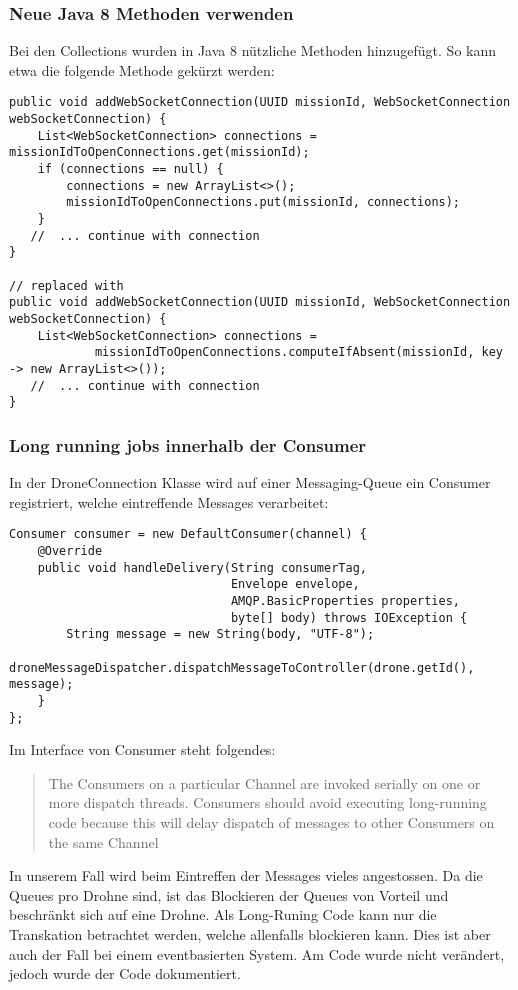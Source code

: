 \subsubsection{Neue Java 8 Methoden verwenden}
Bei den Collections wurden in Java 8 nützliche Methoden hinzugefügt. So kann etwa die folgende Methode gekürzt werden:

\begin{lstlisting}
public void addWebSocketConnection(UUID missionId, WebSocketConnection webSocketConnection) {
    List<WebSocketConnection> connections = missionIdToOpenConnections.get(missionId);
    if (connections == null) {
        connections = new ArrayList<>();
        missionIdToOpenConnections.put(missionId, connections);
    }
   //  ... continue with connection
}

// replaced with
public void addWebSocketConnection(UUID missionId, WebSocketConnection webSocketConnection) {
    List<WebSocketConnection> connections =
            missionIdToOpenConnections.computeIfAbsent(missionId, key -> new ArrayList<>());
   //  ... continue with connection
}
\end{lstlisting}


\subsubsection{Long running jobs innerhalb der Consumer}
In der DroneConnection Klasse wird auf einer Messaging-Queue ein Consumer registriert, welche eintreffende Messages verarbeitet:
\begin{lstlisting}
Consumer consumer = new DefaultConsumer(channel) {
    @Override
    public void handleDelivery(String consumerTag,
                               Envelope envelope,
                               AMQP.BasicProperties properties,
                               byte[] body) throws IOException {
        String message = new String(body, "UTF-8");
        droneMessageDispatcher.dispatchMessageToController(drone.getId(), message);
    }
};
\end{lstlisting}

Im Interface von Consumer steht folgendes:
\begin{quote} 
The Consumers on a particular Channel are invoked serially on one or more dispatch threads. Consumers should avoid executing long-running code because this will delay dispatch of messages to other Consumers on the same Channel	
\end{quote}

In unserem Fall wird beim Eintreffen der Messages vieles angestossen. Da die Queues pro Drohne sind, ist das Blockieren der Queues von Vorteil und beschränkt sich auf eine Drohne. Als Long-Runing Code kann nur die Transkation betrachtet werden, welche allenfalls blockieren kann. Dies ist aber auch der Fall bei einem eventbasierten System. Am Code wurde nicht verändert, jedoch wurde der Code dokumentiert.

